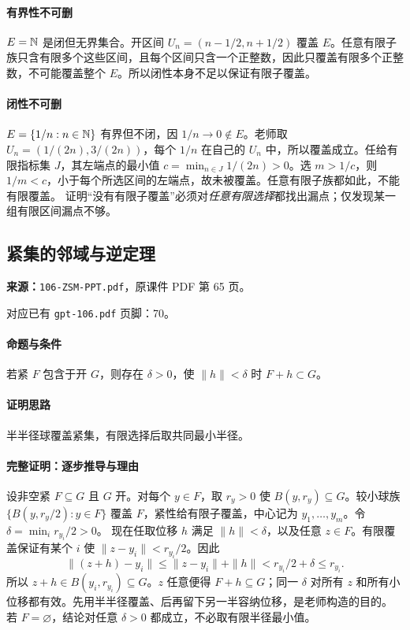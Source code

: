 \paragraph{有界性不可删}
$E=\mathbb{N}$ 是闭但无界集合。开区间 $U_n=(n-1/2,n+1/2)$ 覆盖 $E$。任意有限子族只含有限多个这些区间，且每个区间只含一个正整数，因此只覆盖有限多个正整数，不可能覆盖整个 $E$。所以闭性本身不足以保证有限子覆盖。
\paragraph{闭性不可删}
$E=\{1/n:n\in\mathbb{N}\}$ 有界但不闭，因 $1/n\to0\notin E$。老师取 $U_n=(1/(2n),3/(2n))$，每个 $1/n$ 在自己的 $U_n$ 中，所以覆盖成立。任给有限指标集 $J$，其左端点的最小值 $c=\min_{n\in J}1/(2n)>0$。选 $m>1/c$，则 $1/m<c$，小于每个所选区间的左端点，故未被覆盖。任意有限子族都如此，不能有限覆盖。
证明“没有有限子覆盖”必须对\emph{任意有限选择}都找出漏点；仅发现某一组有限区间漏点不够。

\clearpage\subsection{紧集的邻域与逆定理}
\textbf{来源：}\texttt{106-ZSM-PPT.pdf}，原课件 PDF 第 65 页。\par
对应已有 \texttt{gpt-106.pdf} 页脚：70。\par
\paragraph{命题与条件}若紧 $F$ 包含于开 $G$，则存在 $\delta>0$，使 $\|h\|<\delta$ 时 $F+h\subset G$。
\paragraph{证明思路}半半径球覆盖紧集，有限选择后取共同最小半径。
\paragraph{完整证明：逐步推导与理由}

设非空紧 $F\subseteq G$ 且 $G$ 开。对每个 $y\in F$，取 $r_y>0$ 使 $B(y,r_y)\subseteq G$。较小球族 $\{B(y,r_y/2):y\in F\}$ 覆盖 $F$，紧性给有限子覆盖，中心记为 $y_1,\ldots,y_m$。令 $\delta=\min_i r_{y_i}/2>0$。
现在任取位移 $h$ 满足 $\|h\|<\delta$，以及任意 $z\in F$。有限覆盖保证有某个 $i$ 使 $\|z-y_i\|<r_{y_i}/2$。因此
\[\|(z+h)-y_i\|\le\|z-y_i\|+\|h\|<r_{y_i}/2+\delta\le r_{y_i}.\]
所以 $z+h\in B(y_i,r_{y_i})\subseteq G$。$z$ 任意便得 $F+h\subseteq G$；同一 $\delta$ 对所有 $z$ 和所有小位移都有效。先用半半径覆盖、后再留下另一半容纳位移，是老师构造的目的。
若 $F=\varnothing$，结论对任意 $\delta>0$ 都成立，不必取有限半径最小值。

